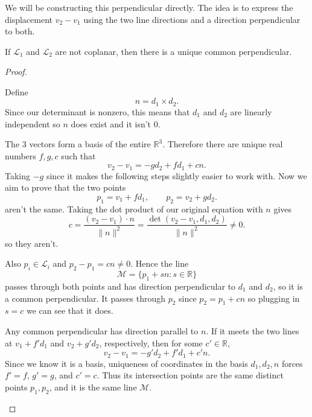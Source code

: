\documentclass[11pt]{scrartcl}
\begin{document}
\begin{soln}
    \subsubsection*{}

	We will be constructing this perpendicular directly.
    The idea is to express the displacement $v_2-v_1$ using the two
    line directions and a direction perpendicular to both.

    \begin{claim*}
        If $\mathcal L_1$ and $\mathcal L_2$ are not coplanar, then
        there is a unique common perpendicular.
    \end{claim*}

    \begin{proof}
        \begin{subproof}
            Define
            \[
            n=d_1\times d_2.
            \]
			Since our determinant is nonzero, this means that $d_1$ and $d_2$ are
			linearly independent so $n$ does exist and it isn't $0$.

			The 3 vectors form a basis of the entire $\mathbb R^3$.
            Therefore there are unique real numbers $f,g,c$ such that
            \[
            v_2-v_1=-gd_2+fd_1+cn.
            \]
			Taking $-g$ since it makes the following steps slightly easier to work 
            with. Now we aim to prove 
			that the two points 
			\[
            p_1=v_1+fd_1,
            \qquad
            p_2=v_2+gd_2.
            \]
			aren't the same. 
            Taking the dot product of our original equation with $n$ gives
            \[
            c=\frac{(v_2-v_1)\cdot n}{\|n\|^2}
             =\frac{\det(v_2-v_1,d_1,d_2)}{\|n\|^2}\neq0.
            \]
            so they aren't.
            
            Also $p_i\in\mathcal L_i$ and $p_2-p_1=cn\neq0$.
            Hence the line
            \[
            \mathcal M=\{p_1+sn:s\in\mathbb R\}
            \]
            passes through both points and has direction perpendicular
            to $d_1$ and $d_2$, so it is a common perpendicular. It passes through 
			$p_2$ since $p_2=p_1+cn$ so plugging in $s=c$ we can see that it does.
        \end{subproof}

        \begin{subproof}[Unique?]
            Any common perpendicular has direction parallel to $n$.
            If it meets the two lines at $v_1+f'd_1$ and $v_2+g'd_2$,
            respectively, then for some $c'\in\mathbb R$,
            \[
            v_2-v_1=-g'd_2+f'd_1+c'n.
            \]
            Since we know it is a basis,
			uniqueness of coordinates in the basis $d_1,d_2,n$ forces
            $f'=f$, $g'=g$, and $c'=c$. 
            Thus its intersection points are the same distinct points
            $p_1,p_2$, and it is the same line $\mathcal M$.
        \end{subproof}
    \end{proof}
\end{soln}
\end{document}
